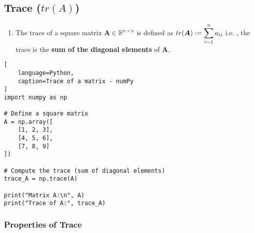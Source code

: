 \subsection{Trace ($tr(A)$)}


\begin{enumerate}
    \item The trace of a square matrix $\bm{A} \in \mathbb{R}^{n\times n}$ is defined as $tr(\bm{A}) := \displaystyle\sum^n _{i=1} a_{ii}$ i.e. , the trace is the \textbf{sum of the diagonal elements} of $\bm{A}$.
    \hfill \cite{mfml/book/mml/Deisenroth-Faisal-Ong}

    
\end{enumerate}


\begin{lstlisting}[
    language=Python,
    caption=Trace of a matrix - numPy
]
import numpy as np

# Define a square matrix
A = np.array([
    [1, 2, 3],
    [4, 5, 6],
    [7, 8, 9]
])

# Compute the trace (sum of diagonal elements)
trace_A = np.trace(A)

print("Matrix A:\n", A)
print("Trace of A:", trace_A)
\end{lstlisting}





\subsubsection{Properties of Trace}

